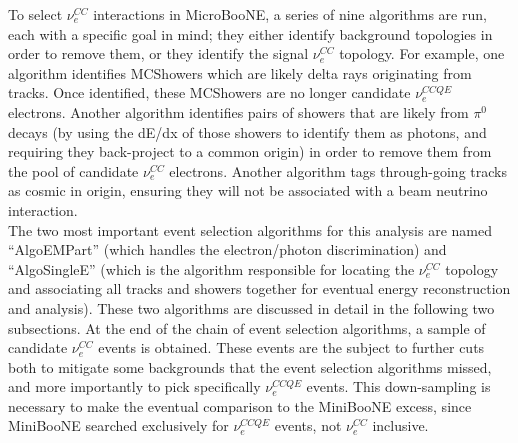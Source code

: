To select $\nu_e^{CC}$ interactions in MicroBooNE, a series of nine algorithms are run, each with a specific goal in mind; they either identify background topologies in order to remove them, or they identify the signal $\nu_e^{CC}$ topology. For example, one algorithm identifies {\sc MCShowers} which are likely delta rays originating from tracks. Once identified, these {\sc MCShowers} are no longer candidate $\nu_e^{CCQE}$ electrons. Another algorithm identifies pairs of showers that are likely from $\pi^0$ decays (by using the dE/dx of those showers to identify them as photons, and requiring they back-project to a common origin) in order to remove them from the pool of candidate $\nu_e^{CC}$ electrons. Another algorithm tags through-going tracks as cosmic in origin, ensuring they will not be associated with a beam neutrino interaction.\\

The two most important event selection algorithms for this analysis are named ``AlgoEMPart'' (which handles the electron/photon discrimination) and ``AlgoSingleE'' (which is the algorithm responsible for locating the $\nu_e^{CC}$ topology and associating all tracks and showers together for eventual energy reconstruction and analysis). These two algorithms are discussed in detail in the following two subsections. At the end of the chain of event selection algorithms, a sample of candidate $\nu_e^{CC}$ events is obtained. These events are the subject to further cuts both to mitigate some backgrounds that the event selection algorithms missed, and more importantly to pick specifically $\nu_e^{CCQE}$ events. This down-sampling is necessary to make the eventual comparison to the MiniBooNE excess, since MiniBooNE searched exclusively for $\nu_e^{CCQE}$ events, not $\nu_e^{CC}$ inclusive.


